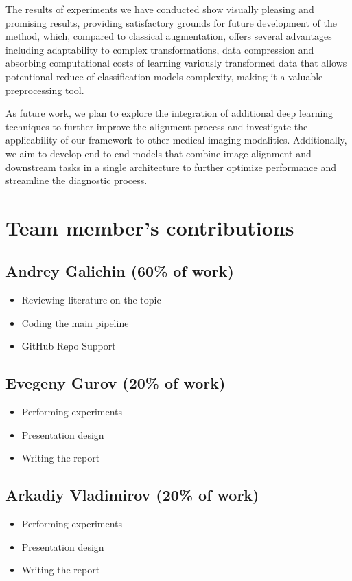 \documentclass{article}
\begin{document}
The results of experiments we have conducted show visually pleasing and 
promising results, providing satisfactory grounds for future development of the 
method, which, compared to classical augmentation, offers several advantages
including adaptability to complex transformations, data compression and 
absorbing computational costs of learning variously transformed data that 
allows potentional reduce of classification models complexity, making it a 
valuable preprocessing tool.

As future work, we plan to explore the integration of additional deep learning 
techniques to further improve the alignment process and investigate the 
applicability of our framework to other medical imaging modalities. 
Additionally, we aim to develop end-to-end models that combine image alignment 
and downstream tasks in a single architecture to further optimize performance 
and streamline the diagnostic process.



\clearpage

\newpage
\appendix
\section{Team member's contributions}
\label{appendix-contrib}

\subsection*{Andrey Galichin (60\% of work)}
\begin{itemize}
    \item Reviewing literature on the topic
    \item Coding the main pipeline
    \item GitHub Repo Support
\end{itemize}

\subsection*{Evegeny Gurov (20\% of work)}
\begin{itemize}
    \item Performing experiments
    \item Presentation design
    \item Writing the report
\end{itemize}

\subsection*{Arkadiy Vladimirov (20\% of work)}
\begin{itemize}
    \item Performing experiments
    \item Presentation design
    \item Writing the report
\end{itemize}
\end{document}
